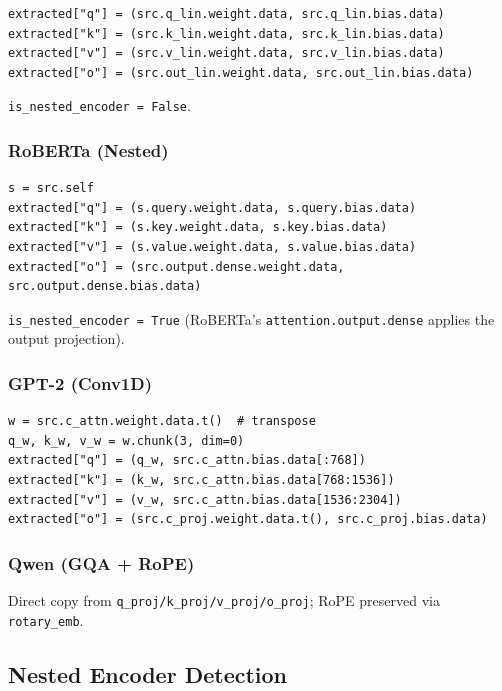 \begin{lstlisting}
extracted["q"] = (src.q_lin.weight.data, src.q_lin.bias.data)
extracted["k"] = (src.k_lin.weight.data, src.k_lin.bias.data)
extracted["v"] = (src.v_lin.weight.data, src.v_lin.bias.data)
extracted["o"] = (src.out_lin.weight.data, src.out_lin.bias.data)
\end{lstlisting}

\texttt{is\_nested\_encoder = False}.

\subsubsection{RoBERTa (Nested)}

\begin{lstlisting}
s = src.self
extracted["q"] = (s.query.weight.data, s.query.bias.data)
extracted["k"] = (s.key.weight.data, s.key.bias.data)
extracted["v"] = (s.value.weight.data, s.value.bias.data)
extracted["o"] = (src.output.dense.weight.data, src.output.dense.bias.data)
\end{lstlisting}

\texttt{is\_nested\_encoder = True} (RoBERTa's \texttt{attention.output.dense} applies the 
output projection).

\subsubsection{GPT-2 (Conv1D)}

\begin{lstlisting}
w = src.c_attn.weight.data.t()  # transpose
q_w, k_w, v_w = w.chunk(3, dim=0)
extracted["q"] = (q_w, src.c_attn.bias.data[:768])
extracted["k"] = (k_w, src.c_attn.bias.data[768:1536])
extracted["v"] = (v_w, src.c_attn.bias.data[1536:2304])
extracted["o"] = (src.c_proj.weight.data.t(), src.c_proj.bias.data)
\end{lstlisting}

\subsubsection{Qwen (GQA + RoPE)}

Direct copy from \texttt{q\_proj/k\_proj/v\_proj/o\_proj}; RoPE preserved via 
\texttt{rotary\_emb}.

\subsection{Nested Encoder Detection}

